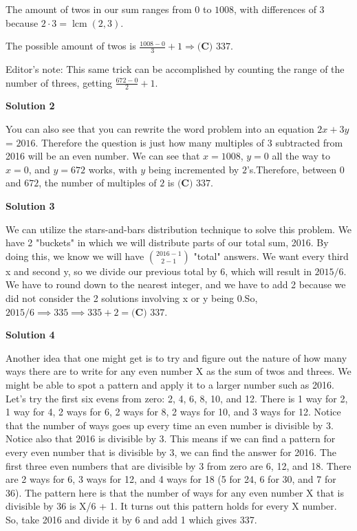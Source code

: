 \begin{enumerate}
The amount of twos in our sum ranges from $0$ to $1008$, with differences of $3$ because $2 \cdot 3 = \operatorname{lcm}(2, 3)$.

 The possible amount of twos is $\frac{1008 - 0}{3} + 1 \Rightarrow \boxed{\textbf{(C) } 337}$.

 Editor's note: This same trick can be accomplished by counting the range of the number of threes, getting $\frac{672 - 0}{2} + 1$.

 



\textbf{Solution 2}

You can also see that you can rewrite the word problem into an equation $2x + 3y$ = $2016$. Therefore the question is just how many multiples of $3$ subtracted from 2016 will be an even number. We can see that $x = 1008$, $y = 0$ all the way to $x = 0$, and $y = 672$ works, with $y$ being incremented by $2$'s.Therefore, between $0$ and $672$, the number of multiples of $2$ is $\boxed{\textbf{(C) }337}$.

 



\textbf{Solution 3}

We can utilize the stars-and-bars distribution technique to solve this problem. We have 2 "buckets" in which we will distribute parts of our total sum, 2016. By doing this, we know we will have $\binom{2016-1}{2-1}$ "total" answers. We want every third x and second y, so we divide our previous total by 6, which will result in $2015/6$. We have to round down to the nearest integer, and we have to add 2 because we did not consider the 2 solutions involving x or y being 0.So, $2015/6\implies335\implies335+2=\boxed{\textbf{(C) }337}$.

 



\textbf{Solution 4}

Another idea that one might get is to try and figure out the nature of how many ways there are to write for any even number X as the sum of twos and threes. We might be able to spot a pattern and apply it to a larger number such as 2016. Let's try the first six evens from zero: 2, 4, 6, 8, 10, and 12. There is 1 way for 2, 1 way for 4, 2 ways for 6, 2 ways for 8, 2 ways for 10, and 3 ways for 12. Notice that the number of ways goes up every time an even number is divisible by 3. Notice also that 2016 is divisible by 3. This means if we can find a pattern for every even number that is divisible by 3, we can find the answer for 2016. The first three even numbers that are divisible by 3 from zero are 6, 12, and 18. There are 2 ways for 6, 3 ways for 12, and 4 ways for 18 (5 for 24, 6 for 30, and 7 for 36). The pattern here is that the number of ways for any even number X that is divisible by 36 is X/6 + 1. It turns out this pattern holds for every X number. So, take 2016 and divide it by 6 and add 1 which gives 337. 


\end{enumerate}
